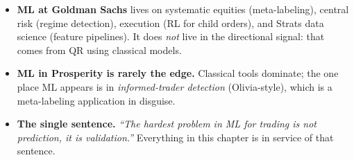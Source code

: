 \begin{itemize}
  expected to live for years is the wrong model.
  \item \textbf{ML at Goldman Sachs} lives on systematic
  equities (meta-labeling), central risk
  (regime detection), execution (RL for child orders),
  and Strats data science (feature pipelines). It does
  \emph{not} live in the directional signal: that comes
  from QR using classical models.
  \item \textbf{ML in Prosperity is rarely the edge.}
  Classical tools dominate; the one place ML appears is
  in \emph{informed-trader detection} (Olivia-style),
  which is a meta-labeling application in disguise.
  \item \textbf{The single sentence.} \emph{``The hardest
  problem in ML for trading is not prediction, it is
  validation.''} Everything in this chapter is in
  service of that sentence.
\end{itemize}
